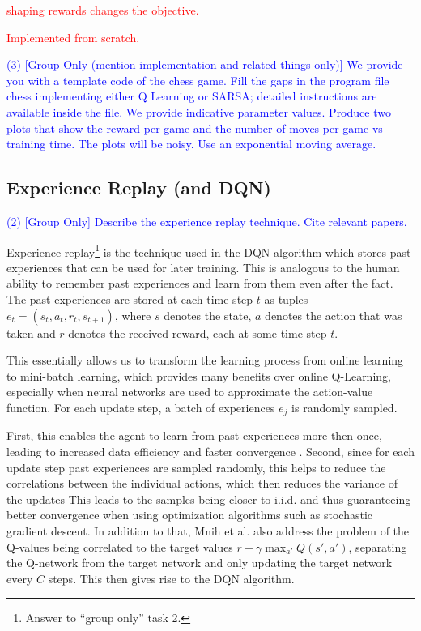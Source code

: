 \documentclass[conference]{IEEEtran}
\begin{document}
\textcolor{red}{shaping rewards changes the objective.}

\textcolor{red}{Implemented from scratch.}

\textcolor{blue}{(3) [Group Only (mention implementation and related things only)] We provide you with a template code of the chess game. Fill the gaps in the
program file chess implementing either Q Learning or SARSA; detailed instructions
are available inside the file. We provide indicative parameter values. Produce two
plots that show the reward per game and the number of moves per game vs training
time. The plots will be noisy. Use an exponential moving average.}



\subsection{Experience Replay (and DQN)}

\textcolor{blue}{(2) [Group Only] Describe the experience replay technique. Cite relevant papers.}

Experience replay\footnote{Answer to ``group only'' task 2.} is the technique used in the DQN algorithm \cite{atari2013} which stores past experiences that can be used for later training. This is analogous to the human ability to remember past experiences and learn from them even after the fact. The past experiences are stored at each time step $t$ as tuples $e_t = (s_t, a_t, r_t, s_{t+1})$, where $s$ denotes the state, $a$ denotes the action that was taken and $r$ denotes the received reward, each at some time step $t$.

This essentially allows us to transform the learning process from online learning to mini-batch learning, which provides many benefits over online Q-Learning, especially when neural networks are used to approximate the action-value function. For each update step, a batch of experiences $e_j$ is randomly sampled.

First, this enables the agent to learn from past experiences more then once, leading to increased data efficiency and faster convergence \cite{atari2013}. Second, since for each update step past experiences are sampled randomly, this helps to reduce the correlations between the individual actions, which then reduces the variance of the updates \cite{atari2013} This leads to the samples being closer to i.i.d. and thus guaranteeing better convergence when using optimization algorithms such as stochastic gradient descent. In addition to that, Mnih et al. \cite{dqn2015} also address the problem of the Q-values being correlated to the target values $r+\gamma \max_{a'} Q(s',a')$, separating the Q-network from the target network and only updating the target network every $C$ steps. This then gives rise to the DQN algorithm.
\end{document}
